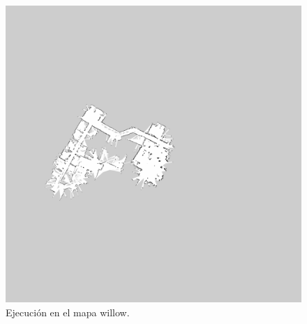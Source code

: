 \documentclass[11pt]{article}
\begin{document}
\begin{figure}[H] 
	\centering
	\includegraphics[width=15cm]{img/ejecucion2.png}
	\caption{Ejecución en el mapa willow.}
\end{figure}
\end{document}
